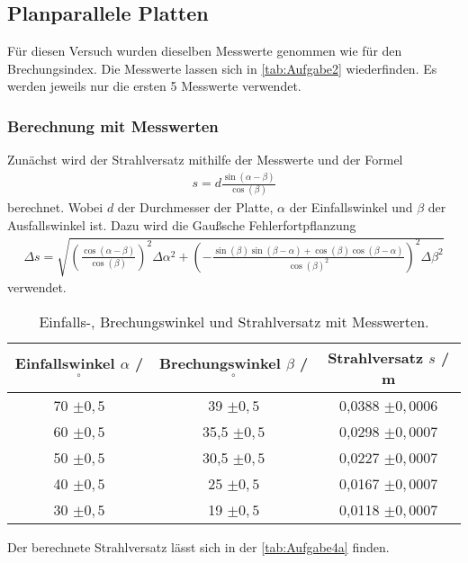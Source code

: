 \subsection{Planparallele Platten}

Für diesen Versuch wurden dieselben Messwerte genommen wie für den Brechungsindex. Die Messwerte lassen sich in \autoref{tab:Aufgabe2} wiederfinden.
Es werden jeweils nur die ersten 5 Messwerte verwendet.\\

\subsubsection{Berechnung mit Messwerten}
Zunächst wird der Strahlversatz mithilfe der Messwerte und der Formel
\begin{align}
  \label{eqn:Geschw}
  s = d \frac{\sin(\alpha - \beta)}{\cos(\beta)}
\end{align}
berechnet. Wobei $d$ der Durchmesser der Platte, $\alpha$ der Einfallswinkel und $\beta$ der Ausfallswinkel ist.
Dazu wird die Gaußsche Fehlerfortpflanzung
\begin{align}
  \label{eqn:Gauss2}
  \Delta s = \sqrt{\left(\frac{\cos(\alpha - \beta)}{\cos(\beta)}\right)^2 \Delta \alpha^2 + \left(-\frac{\sin(\beta)\sin(\beta - \alpha) + \cos(\beta)\cos(\beta - \alpha)}{\cos(\beta)^2}\right)^2 \Delta \beta^2}
\end{align}
verwendet.

\begin{table}
  \centering
  \caption{Einfalls-, Brechungswinkel und Strahlversatz mit Messwerten.}
  \label{tab:Aufgabe4a}
  \begin{tabular}{c c c}
    \toprule
    Einfallswinkel $\alpha$ / $^{\circ}$& Brechungswinkel $\beta$ / $^{\circ}$ & Strahlversatz $s$ / m\\
    \midrule
    70 $\pm 0,5$ & 39 $\pm 0,5$ & 0,0388 $\pm 0,0006$ \\
    60 $\pm 0,5$ & 35,5 $\pm 0,5$ & 0,0298 $\pm 0,0007$\\
    50 $\pm 0,5$ & 30,5 $\pm 0,5$ & 0,0227 $\pm 0,0007$\\
    40 $\pm 0,5$ & 25 $\pm 0,5$ & 0,0167 $\pm 0,0007$\\
    30 $\pm 0,5$ & 19 $\pm 0,5$ & 0,0118 $\pm 0,0007$\\
    \bottomrule
  \end{tabular}
\end{table}

Der berechnete Strahlversatz lässt sich in der \autoref{tab:Aufgabe4a} finden.\\

